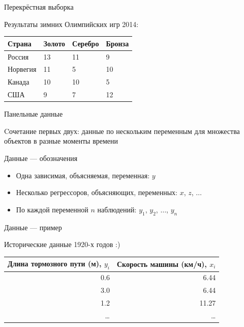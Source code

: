 \documentclass[ignorenonframetext,]{beamer}
\begin{document}
\begin{frame}{Перекрёстная выборка}

Результаты зимних Олимпийских игр 2014:

\begin{longtable}[c]{@{}llll@{}}
\toprule
Страна & Золото & Серебро & Бронза\tabularnewline
\midrule
\endhead
Россия & 13 & 11 & 9\tabularnewline
Норвегия & 11 & 5 & 10\tabularnewline
Канада & 10 & 10 & 5\tabularnewline
США & 9 & 7 & 12\tabularnewline
\bottomrule
\end{longtable}

\end{frame}

\begin{frame}{Панельные данные}

Cочетание первых двух: данные по нескольким переменным для множества
объектов в разные моменты времени

\end{frame}

\begin{frame}{Данные --- обозначения}

\begin{itemize}
\itemsep1pt\parskip0pt
\item
  Одна зависимая, объясняемая, переменная: \(y\)
\item
  Несколько регрессоров, объясняющих, переменных: \(x\), \(z\),
  \(\ldots\)
\item
  По каждой переменной \(n\) наблюдений: \(y_1\), \(y_2\), \(\ldots\),
  \(y_n\)
\end{itemize}

\end{frame}

\begin{frame}{Данные --- пример}

Исторические данные 1920-х годов :)

\begin{longtable}[c]{@{}rr@{}}
\toprule
Длина тормозного пути (м), \(y_i\) & Скорость машины (км/ч),
\(x_i\)\tabularnewline
\midrule
\endhead
0.6 & 6.44\tabularnewline
3.0 & 6.44\tabularnewline
1.2 & 11.27\tabularnewline
\ldots{} & \ldots{}\tabularnewline
\bottomrule
\end{longtable}

\end{frame}
\end{document}
